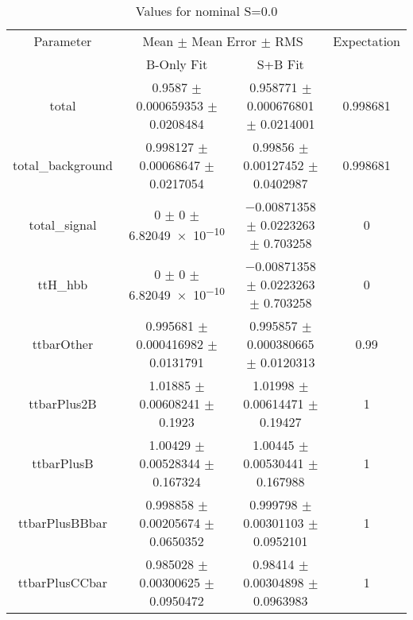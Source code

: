 \begin{table}
\centering
\caption{Values for nominal S=0.0}
\begin{tabular}{cccc}
\toprule
Parameter & \multicolumn{2}{c}{Mean $\pm$ Mean Error $\pm$ RMS} & Expectation\\
 & B-Only Fit & S+B Fit & \\
\midrule
total & \num{0.9587} $\pm$ \num{0.000659353} $\pm$ \num{0.0208484} & \num{0.958771} $\pm$ \num{0.000676801} $\pm$ \num{0.0214001} & \num{0.998681}\\
total\_background & \num{0.998127} $\pm$ \num{0.00068647} $\pm$ \num{0.0217054} & \num{0.99856} $\pm$ \num{0.00127452} $\pm$ \num{0.0402987} & \num{0.998681}\\
total\_signal & \num{0} $\pm$ \num{0} $\pm$ \num{6.82049e-10} & \num{-0.00871358} $\pm$ \num{0.0223263} $\pm$ \num{0.703258} & \num{0}\\
ttH\_hbb & \num{0} $\pm$ \num{0} $\pm$ \num{6.82049e-10} & \num{-0.00871358} $\pm$ \num{0.0223263} $\pm$ \num{0.703258} & \num{0}\\
ttbarOther & \num{0.995681} $\pm$ \num{0.000416982} $\pm$ \num{0.0131791} & \num{0.995857} $\pm$ \num{0.000380665} $\pm$ \num{0.0120313} & \num{0.99}\\
ttbarPlus2B & \num{1.01885} $\pm$ \num{0.00608241} $\pm$ \num{0.1923} & \num{1.01998} $\pm$ \num{0.00614471} $\pm$ \num{0.19427} & \num{1}\\
ttbarPlusB & \num{1.00429} $\pm$ \num{0.00528344} $\pm$ \num{0.167324} & \num{1.00445} $\pm$ \num{0.00530441} $\pm$ \num{0.167988} & \num{1}\\
ttbarPlusBBbar & \num{0.998858} $\pm$ \num{0.00205674} $\pm$ \num{0.0650352} & \num{0.999798} $\pm$ \num{0.00301103} $\pm$ \num{0.0952101} & \num{1}\\
ttbarPlusCCbar & \num{0.985028} $\pm$ \num{0.00300625} $\pm$ \num{0.0950472} & \num{0.98414} $\pm$ \num{0.00304898} $\pm$ \num{0.0963983} & \num{1}\\
\bottomrule
\end{tabular}
\end{table}
